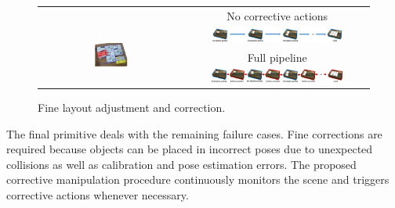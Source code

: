 
\begin{figure}
\centering
\begin{tabular}{@{}c@{}c@{}}
& No corrective actions\\
\multirow{3}{*}{\includegraphics[width=0.24\textwidth]{Figures/finer_fix.pdf}}
& \includegraphics[width=0.75\textwidth,valign=t]{./Figures/res_step_adaptive.png}
\\\cline{2-2}
& Full pipeline\\
& \includegraphics[width=0.75\textwidth]{./Figures/res_step_full.png}
\\%
\end{tabular}
\caption{Fine layout adjustment and correction.}
\label{fig:finer_fix}
\end{figure}

The final primitive deals with the remaining failure cases. Fine corrections are required because objects can be placed in incorrect poses due to unexpected collisions as well as calibration and pose estimation errors.  The proposed corrective manipulation procedure continuously monitors the scene and triggers corrective actions whenever necessary. 

